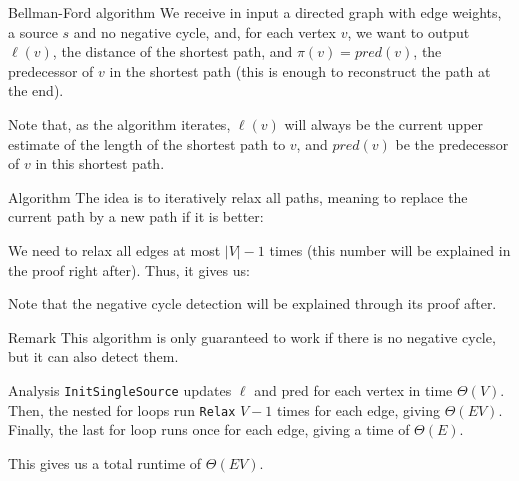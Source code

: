 \documentclass[a4paper]{article}
\begin{document}
\begin{parag}{Bellman-Ford algorithm}
    We receive in input a directed graph with edge weights, a source $s$ and no negative cycle, and, for each vertex $v$, we want to output $\ell \left(v\right)$, the distance of the shortest path, and $\pi\left(v\right) = pred\left(v\right)$, the predecessor of $v$ in the shortest path (this is enough to reconstruct the path at the end).

    Note that, as the algorithm iterates, $\ell \left(v\right)$ will always be the current upper estimate of the length of the shortest path to $v$, and $pred\left(v\right)$ be the predecessor of $v$ in this shortest path.

    \begin{subparag}{Algorithm}
        The idea is to iteratively relax all paths, meaning to replace the current path by a new path if it is better: 
        
        We need to relax all edges at most $\left|V\right| - 1$ times (this number will be explained in the proof right after). Thus, it gives us:

        Note that the negative cycle detection will be explained through its proof after.
    \end{subparag}

    \begin{subparag}{Remark}
        This algorithm is only guaranteed to work if there is no negative cycle, but it can also detect them. 
    \end{subparag}
    
    \begin{subparag}{Analysis}
        \texttt{InitSingleSource} updates $\ell $ and pred for each vertex in time $\Theta\left(V\right)$. Then, the nested for loops run \texttt{Relax} $V-1$ times for each edge, giving $\Theta\left(EV\right)$. Finally, the last for loop runs once for each edge, giving a time of $\Theta\left(E\right)$.

        This gives us a total runtime of $\Theta\left(EV\right)$.
    \end{subparag}
\end{parag}
\end{document}
